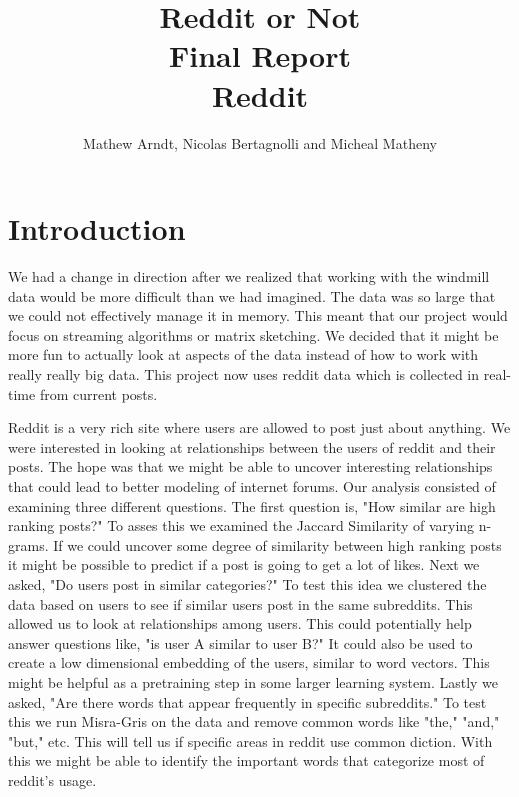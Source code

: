 \documentclass[12pt]{article}
\numberwithin{equation}{section}
\begin{document}
\title{Reddit or Not\\ Final Report \\ Reddit }
\author{Mathew Arndt, Nicolas Bertagnolli and Micheal Matheny}
\date{}
\maketitle
{}
\newpage
  
\section*{Introduction}
		We had a change in direction after we realized that working with the windmill data would  be more difficult than we had imagined.  The data was so large that we could not effectively manage it in memory. This meant that our project would focus on streaming algorithms or matrix sketching.  We decided that it might be more fun to actually look at aspects of the data instead of how to work with really really big data.  This project now uses reddit data which is collected in real-time from current posts.  \newline
		
		Reddit is a very rich site where users are allowed to post just about anything.  We were interested in looking at relationships between the users of reddit and their posts.  The hope was that we might be able to uncover interesting relationships that could lead to better modeling of internet forums.  Our analysis consisted of examining three different questions. The first question is, "How similar are high ranking posts?"  To asses this we examined the Jaccard Similarity of varying n-grams.  If we could uncover some degree of similarity between high ranking posts it might be possible to predict if a post is going to get a lot of likes. Next we asked, "Do users post in similar categories?"  To test this idea we clustered the data based on users to see if similar users post in the same subreddits.  This allowed us to look at relationships among users.  This could  potentially help answer questions like, "is user A similar to user B?"  It could also be used to create a low dimensional embedding of the users, similar to word vectors.  This might be helpful as a pretraining step in some larger learning system. Lastly we asked, "Are there words that appear frequently in specific subreddits." To test this we run Misra-Gris on the data and remove common words like "the," "and," "but," etc.  This will tell us if specific areas in reddit use common diction.  With this we might be able to identify the important words that categorize most of reddit's usage.
		
\end{document}
